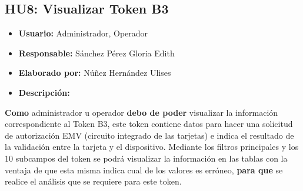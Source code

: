 \subsection{HU8: Visualizar Token B3}
\begin{itemize}
	\item \textbf{Usuario:} Administrador, Operador
	\item \textbf{Responsable:} Sánchez Pérez Gloria Edith
	\item \textbf{Elaborado por:} Núñez Hernández Ulises
	\item \textbf{Descripción:}
\end{itemize}
\textbf{Como} administrador u operador \textbf{debo de poder} visualizar la información correspondiente al Token B3, este token contiene datos para hacer una solicitud de autorización EMV (circuito integrado de las tarjetas) e indica el resultado de la validación entre la tarjeta y el dispositivo. Mediante los filtros principales y los 10 subcampos del token se podrá visualizar la información en las tablas con la ventaja de que esta misma indica cual de los valores es erróneo, \textbf{para que} se realice el análisis que se requiere para este token.